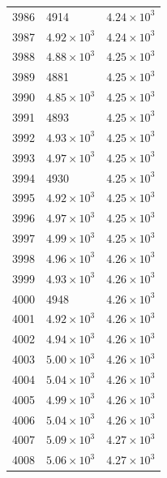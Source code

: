 \begin{table}[H]
\begin{tabular}{lll}
3986 & 4914 & $\displaystyle 4.24 \times 10^{3}$ \\
3987 & $\displaystyle 4.92 \times 10^{3}$ & $\displaystyle 4.24 \times 10^{3}$ \\
3988 & $\displaystyle 4.88 \times 10^{3}$ & $\displaystyle 4.25 \times 10^{3}$ \\
3989 & 4881 & $\displaystyle 4.25 \times 10^{3}$ \\
3990 & $\displaystyle 4.85 \times 10^{3}$ & $\displaystyle 4.25 \times 10^{3}$ \\
3991 & 4893 & $\displaystyle 4.25 \times 10^{3}$ \\
3992 & $\displaystyle 4.93 \times 10^{3}$ & $\displaystyle 4.25 \times 10^{3}$ \\
3993 & $\displaystyle 4.97 \times 10^{3}$ & $\displaystyle 4.25 \times 10^{3}$ \\
3994 & 4930 & $\displaystyle 4.25 \times 10^{3}$ \\
3995 & $\displaystyle 4.92 \times 10^{3}$ & $\displaystyle 4.25 \times 10^{3}$ \\
3996 & $\displaystyle 4.97 \times 10^{3}$ & $\displaystyle 4.25 \times 10^{3}$ \\
3997 & $\displaystyle 4.99 \times 10^{3}$ & $\displaystyle 4.25 \times 10^{3}$ \\
3998 & $\displaystyle 4.96 \times 10^{3}$ & $\displaystyle 4.26 \times 10^{3}$ \\
3999 & $\displaystyle 4.93 \times 10^{3}$ & $\displaystyle 4.26 \times 10^{3}$ \\
4000 & 4948 & $\displaystyle 4.26 \times 10^{3}$ \\
4001 & $\displaystyle 4.92 \times 10^{3}$ & $\displaystyle 4.26 \times 10^{3}$ \\
4002 & $\displaystyle 4.94 \times 10^{3}$ & $\displaystyle 4.26 \times 10^{3}$ \\
4003 & $\displaystyle 5.00 \times 10^{3}$ & $\displaystyle 4.26 \times 10^{3}$ \\
4004 & $\displaystyle 5.04 \times 10^{3}$ & $\displaystyle 4.26 \times 10^{3}$ \\
4005 & $\displaystyle 4.99 \times 10^{3}$ & $\displaystyle 4.26 \times 10^{3}$ \\
4006 & $\displaystyle 5.04 \times 10^{3}$ & $\displaystyle 4.26 \times 10^{3}$ \\
4007 & $\displaystyle 5.09 \times 10^{3}$ & $\displaystyle 4.27 \times 10^{3}$ \\
4008 & $\displaystyle 5.06 \times 10^{3}$ & $\displaystyle 4.27 \times 10^{3}$ \\

\end{tabular}
\end{table}

